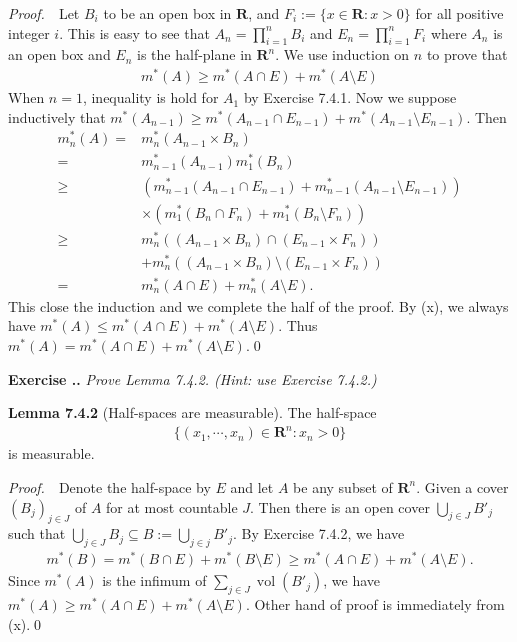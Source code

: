 \documentclass{book}
\DeclareMathOperator{\vol}{vol}
\newcommand{\pff}{\vspace{.25em}\noindent\emph{Proof.}~~}
\newcommand{\titl}[1]{\noindent\textbf{#1}}
\newcounter{Exercise}[section]
\renewcommand{\theExercise}{\thesection.\arabic{Exercise}.}
\newcommand{\new}{\vspace{1.5em}\noindent\textbf{Exercise \stepcounter{Exercise}\textbf{\theExercise}} }
\begin{document}
\pff Let $B_i$ to be an open box in $\mathbf{R}$, and $F_i := \{x \in \mathbf{R} : x > 0\}$ for all positive integer $i$. This is easy to see that $A_n = \prod_{i = 1}^{n} B_i$ and $E_n = \prod_{i = 1}^{n} F_i$ where $A_n$ is an open box and $E_n$ is the half-plane in $\mathbf{R}^n$. We use induction on $n$ to prove that
    \begin{align*}
        m^*(A) \geq m^*(A \cap E) + m^*(A \setminus E)
    \end{align*}
When $n = 1$, inequality is hold for $A_1$ by Exercise 7.4.1. Now we suppose inductively that $m^*(A_{n - 1}) \geq m^*(A_{n - 1} \cap E_{n - 1}) + m^*(A_{n - 1} \setminus E_{n - 1})$. Then
    \begin{align*}
        m_n^*(A)
        =& m_n^*(A_{n - 1} \times B_n)\\
        =& m_{n-1}^*(A_{n - 1})m_{1}^*(B_n)\\
        \geq& \left(m_{n - 1}^*(A_{n - 1} \cap E_{n - 1}) + m_{n - 1}^*(A_{n - 1} \setminus E_{n - 1})\right)\\
            &\times \left(m_{1}^*(B_n \cap F_n) + m_{1}^*(B_n \setminus F_n)\right)\\
        \geq& m_n^*((A_{n - 1} \times B_n) \cap (E_{n - 1} \times F_n))\\
            &+ m_n^*((A_{n - 1} \times B_n) \setminus (E_{n - 1} \times F_n))\\
        =& m_n^*(A \cap E) + m_n^*(A \setminus E).
    \end{align*}
This close the induction and we complete the half of the proof. By (x), we always have $m^*(A) \leq m^*(A \cap E) + m^*(A \setminus E)$. Thus $m^*(A) = m^*(A \cap E) + m^*(A \setminus E)$.\qed


\new\emph{Prove Lemma 7.4.2. (Hint: use Exercise 7.4.2.)}

\begin{framed}
\titl{Lemma 7.4.2} (Half-spaces are measurable). The half-space
    \begin{align*}
        \{(x_1, \cdots, x_n) \in \mathbf{R}^n : x_n > 0\}
    \end{align*}
is measurable.
\end{framed}

\pff Denote the half-space by $E$ and let $A$ be any subset of $\mathbf{R}^n$. Given a cover $(B_j)_{j \in J}$ of $A$ for at most countable $J$. Then there is an open cover $\bigcup_{j \in J}B'_j$ such that $\bigcup_{j \in J} B_j \subseteq B := \bigcup_{j \in j} B'_j$. By Exercise 7.4.2, we have
    \begin{align*}
        m^*(B)
        = m^*(B \cap E) + m^*(B \setminus E)
        \geq m^*(A \cap E) + m^*(A \setminus E).
    \end{align*}
Since $m^*(A)$ is the infimum of $\sum_{j \in J}\vol (B'_j)$, we have $m^*(A) \geq m^*(A \cap E) + m^*(A \setminus E)$. Other hand of proof is immediately from (x).\qed
\end{document}
